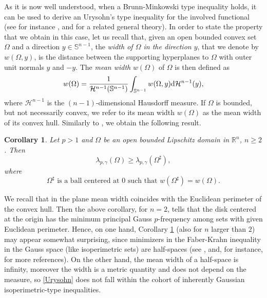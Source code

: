 \documentclass[12pt]{amsart}
\newtheorem{corollary}[theorem]{Corollary}
\newcommand{\R}{\mathbb R}
\newcommand{\1}{\mathbf 1}
\newcommand{\sfe}{{{\mathbb S}^{n-1}}}
\renewcommand{\d}{\mbox{\rm d}}
\begin{document}
As it is now well understood, when a Brunn-Minkowski type inequality holds, it can be used to derive an Urysohn's type inequality for the involved functional (see for instance \cite{BS}, and \cite{S} for a related general theory). In order to state the property that we obtain in this case, let us recall that, given an open bounded convex set $\Omega$ and a direction $y\in\sfe$, the {\em width of $\Omega$ in the direction $y$}, that we denote by $w(\Omega,y)$, is the distance between the supporting hyperplanes to $\Omega$ with outer unit normals $y$ and $-y$. The {\em mean width} $w(\Omega)$ of $\Omega$ is then defined as
$$
w(\Omega)=\frac1{\mathcal{H}^{n-1}(\sfe)}\int_{\sfe}w(\Omega,y)\d{\mathcal H}^{n-1}(y),
$$
where ${\mathcal H}^{n-1}$ is the $(n-1)$-dimensional Hausdorff measure.
If $\Omega$ is bounded, but not necessarily convex, we refer to its mean width $w(\Omega)$ as the mean width of its convex hull. Similarly to \cite[Corollary 1.5]{Andrea-Paolo2024}, we obtain the following result.

\begin{corollary}\label{cor-min} Let $p>1$ and $\Omega$ be an open bounded Lipschitz domain in $\R^n$, $n\ge 2$. Then
\begin{equation}\label{Urysohn}
\lambda_{p,\gamma}(\Omega)\geq \lambda_{p,\gamma}(\Omega^\sharp),
\end{equation}
where
$$
\mbox{$\Omega^\sharp$ is a ball centered at $0$ such that}\,\, w(\Omega^\sharp)=w(\Omega).
$$
\end{corollary}
We recall that in the plane mean width coincides with the Euclidean perimeter of the convex hull. Then the above corollary, for $n=2$, tells that the disk centered at the origin has the minimum principal Gauss $p$-frequency among sets with given Euclidean perimeter. Hence, on one hand, Corollary \ref{cor-min} (also for $n$ larger than $2$) may appear somewhat surprising, since  minimizers in the Faber-Krahn inequality in the Gauss space (like isoperimetric sets) are half-spaces (see \cite{Ehrhard-84} , and, for instance, \cite{BCF, CCLaMP} for more references). On the other hand, the mean width of a half-space is infinity, moreover the width is a metric quantity and does not depend on the measure, so \eqref{Urysohn} does not fall within the cohort of inherently Gaussian isoperimetric-type inequalities.
\end{document}
